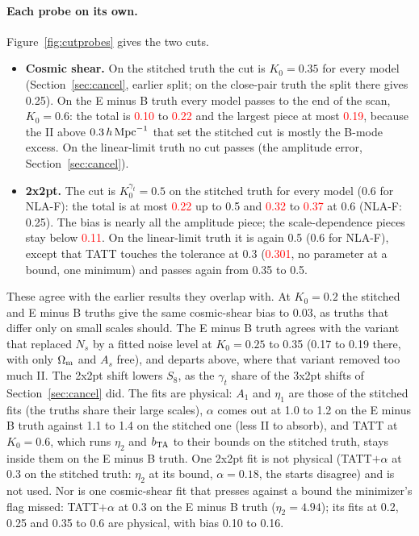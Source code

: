 \documentclass[11pt]{article}
\newcommand{\hMpc}{\,h\,{\rm Mpc}^{-1}}
\newcommand{\Om}{\Omega_{\rm m}}
\newif\ifnumbersfinal
\newcommand{\refresh}[1]{\ifnumbersfinal#1\else\textcolor{red}{#1}\fi}
\newcommand{\SCebTotLo}{\refresh{0.10}}
\newcommand{\SCebTotHi}{\refresh{0.22}}
\newcommand{\SCebBig}{\refresh{0.19}}
\newcommand{\SCtwoMax}{\refresh{0.22}}
\newcommand{\SCtwoSixLo}{\refresh{0.32}}
\newcommand{\SCtwoSixHi}{\refresh{0.37}}
\newcommand{\SCtwoShape}{\refresh{0.11}}
\newcommand{\SCtwoLinTATT}{\refresh{0.301}}
\begin{document}
\paragraph{Each probe on its own.}
Figure~\ref{fig:cutprobes} gives the two cuts.
\begin{itemize}
  \item \textbf{Cosmic shear.} On the stitched truth the cut is $K_0 = 0.35$
    for every model (Section~\ref{sec:cancel}, earlier split; on the
    close-pair truth the split there gives 0.25). On the E minus B truth every
    model passes to the end of the scan, $K_0 = 0.6$: the total is
    \SCebTotLo{} to \SCebTotHi{} and the largest piece at most \SCebBig,
    because the II above $0.3\hMpc$ that set the stitched cut is mostly the
    B-mode excess. On the linear-limit truth no cut passes (the amplitude
    error, Section~\ref{sec:cancel}).
  \item \textbf{2x2pt.} The cut is $K_0^{\gamma_t} = 0.5$ on the stitched
    truth for every model (0.6 for NLA-F): the total is at most \SCtwoMax{}
    up to 0.5 and \SCtwoSixLo{} to \SCtwoSixHi{} at 0.6 (NLA-F: 0.25). The bias is nearly all
    the amplitude piece; the scale-dependence pieces stay below
    \SCtwoShape. On the linear-limit truth it is again 0.5 (0.6 for NLA-F),
    except that TATT touches the tolerance at 0.3 (\SCtwoLinTATT, no
    parameter at a bound, one minimum) and passes again from 0.35 to 0.5.
\end{itemize}
These agree with the earlier results they overlap with. At $K_0 = 0.2$ the
stitched and E minus B truths give the same cosmic-shear bias to 0.03, as
truths that differ only on small scales should. The E minus B truth agrees
with the variant that replaced $N_s$ by a fitted noise level at $K_0 = 0.25$
to 0.35 (0.17 to 0.19 there, with only $\Om$ and $A_s$ free), and departs
above, where that variant removed too much II. The 2x2pt shift lowers $S_8$,
as the $\gamma_t$ share of the 3x2pt shifts of Section~\ref{sec:cancel} did.
The fits are physical: $A_1$ and $\eta_1$ are those of the stitched fits
(the truths share their large scales), $\alpha$ comes out at 1.0 to 1.2
on the E minus B truth against 1.1 to 1.4 on the stitched one (less II to
absorb), and TATT at $K_0 = 0.6$, which runs $\eta_2$ and $b_{\rm TA}$ to their bounds on
the stitched truth, stays inside them on the E minus B truth. One 2x2pt fit is not
physical (TATT$+\alpha$ at 0.3 on the stitched truth: $\eta_2$ at its bound,
$\alpha = 0.18$, the starts disagree) and is not used. Nor is one cosmic-shear
fit that presses against a bound the minimizer's flag missed: TATT$+\alpha$ at
0.3 on the E minus B truth ($\eta_2 = 4.94$); its fits at 0.2, 0.25 and 0.35
to 0.6 are physical, with bias 0.10 to 0.16.
\end{document}
